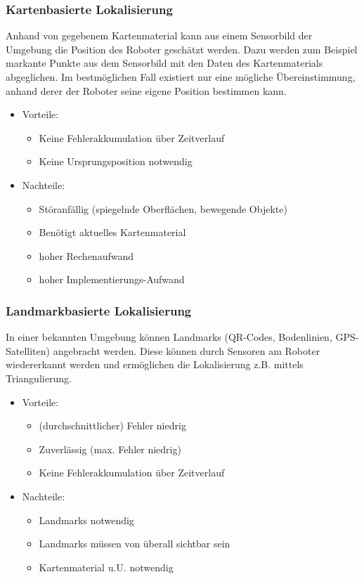 \subsubsection{Kartenbasierte Lokalisierung}

Anhand von gegebenem Kartenmaterial kann aus einem Sensorbild
 der Umgebung die Position des Roboter geschätzt werden.
 Dazu werden zum Beispiel markante Punkte aus dem Sensorbild mit den
 Daten des Kartenmaterials abgeglichen. Im bestmöglichen Fall
 existiert nur eine mögliche Übereinstimmung, anhand derer der
 Roboter seine eigene Position bestimmen kann.

\begin{itemize}
  \item Vorteile:
  \begin{itemize}
    \item Keine Fehlerakkumulation über Zeitverlauf
    \item Keine Ursprungsposition notwendig
  \end{itemize}
  \item Nachteile:
  \begin{itemize}
    \item Störanfällig (spiegelnde Oberflächen, bewegende Objekte)
    \item Benötigt aktuelles Kartenmaterial
    \item hoher Rechenaufwand
    \item hoher Implementierungs-Aufwand
   \end{itemize}
\end{itemize}

\subsubsection{Landmarkbasierte Lokalisierung}

In einer bekannten Umgebung können Landmarks (QR-Codes, Bodenlinien,
 GPS-Satelliten) angebracht werden. Diese können durch Sensoren
 am Roboter wiedererkannt werden und ermöglichen die Lokalisierung
 z.B. mittels Triangulierung.

\begin{itemize}
  \item Vorteile:
  \begin{itemize}
    \item (durchschnittlicher) Fehler niedrig
    \item Zuverlässig (max. Fehler niedrig)
    \item Keine Fehlerakkumulation über Zeitverlauf
  \end{itemize}
  \item Nachteile:
  \begin{itemize}
    \item Landmarks notwendig
    \item Landmarks müssen von überall sichtbar sein
    \item Kartenmaterial u.U. notwendig
   \end{itemize}
\end{itemize}

